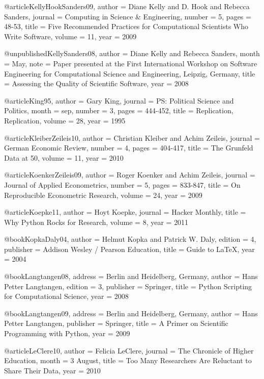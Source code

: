@article{KellyHookSanders09,
author  = {Diane Kelly and D. Hook and Rebecca Sanders},
journal = {Computing in Science \& Engineering},
number  = {5},
pages   = {48-53},
title   = {Five Recommended Practices for Computational Scientists Who Write Software},
volume  = {11},
year    = {2009}
}

@unpublished{KellySanders08,
author = {Diane Kelly and Rebecca Sanders},
month  = {May},
note   = {Paper presented at the First International Workshop on Software Engineering for Computational Science and Engineering, {Leipzig, Germany}},
title  = {Assessing the Quality of Scientific Software},
year   = {2008}
}

@article{King95,
author  = {Gary King},
journal = {{PS:} Political Science and Politics},
month   = sep,
number  = {3},
pages   = {444-452},
title   = {Replication, Replication},
volume  = {28},
year    = {1995}
}

@article{KleiberZeileis10,
author  = {Christian Kleiber and Achim Zeileis},
journal = {German Economic Review},
number  = {4},
pages   = {404-417},
title   = {The Grunfeld Data at 50},
volume  = {11},
year    = {2010}
}

@article{KoenkerZeileis09,
author  = {Roger Koenker and Achim Zeileis},
journal = {Journal of Applied Econometrics},
number  = {5},
pages   = {833-847},
title   = {On Reproducible Econometric Research},
volume  = {24},
year    = {2009}
}

@article{Koepke11,
author  = {Hoyt Koepke},
journal = {Hacker Monthly},
title   = {Why Python Rocks for Research},
volume  = {8},
year    = {2011}
}

@book{KopkaDaly04,
author    = {Helmut Kopka and Patrick W. Daly},
edition   = {4},
publisher = {Addison Wesley / Pearson Education},
title     = {Guide to \LaTeX},
year      = {2004}
}

@book{Langtangen08,
address   = {Berlin and Heidelberg, Germany},
author    = {Hans Petter Langtangen},
edition   = {3},
publisher = {Springer},
title     = {Python Scripting for Computational Science},
year      = {2008}
}

@book{Langtangen09,
address   = {Berlin and Heidelberg, {Germany}},
author    = {Hans Petter Langtangen},
publisher = {Springer},
title     = {A Primer on Scientific Programming with Python},
year      = {2009}
}

@article{LeClere10,
author  = {Felicia {LeClere}},
journal = {The Chronicle of Higher Education},
month   = {3 August},
title   = {Too Many Researchers Are Reluctant to Share Their Data},
year    = {2010}
}


